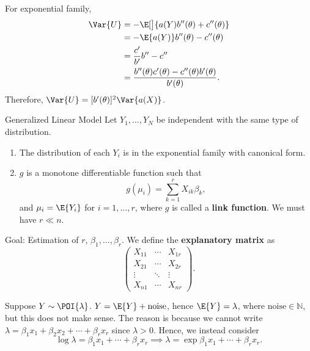 \begin{Remark}{}{}
    For exponential family,
    \begin{align*}
        \Var{U}
         & =-\E[\big]{a(Y)b''(\theta)+c''(\theta)}                          \\
         & =-\E{a(Y)}b''(\theta)-c''(\theta)                                \\
         & =\frac{c'}{b'}b''-c''                                            \\
         & =\frac{b''(\theta)c'(\theta)-c''(\theta)b'(\theta)}{b'(\theta)}.
    \end{align*}
    Therefore, $ \Var{U}=[b'(\theta)]^2\Var{a(X)} $.
\end{Remark}
\begin{Definition}{Generalized Linear Model}{}
    Let $ Y_1,\ldots,Y_N $ be independent with
    the same type of distribution.
    \begin{enumerate}[(1)]
        \item The distribution of each $ Y_i $ is in the exponential family
              with canonical form.
        \item $ g $ is a monotone differentiable function such that
              \[ g(\mu_i)=\sum_{k=1}^{r}X_{ik}\beta_k, \]
              and $ \mu_i=\E{Y_i} $ for $ i=1,\ldots,r $, where
              $ g $ is called a \textbf{link function}. We must have
              $ r\ll n $.
    \end{enumerate}
    Goal: Estimation of $ r $, $ \beta_1,\ldots,\beta_r $.
    We define the \textbf{explanatory matrix} as
    \[ \begin{pmatrix}
            X_{11} & \cdots & X_{1r} \\
            X_{21} & \cdots & X_{2r} \\
            \vdots & \ddots & \vdots \\
            X_{n1} & \cdots & X_{nr}
        \end{pmatrix}. \]
\end{Definition}
\begin{Example}{}{}
    Suppose $ Y \sim \POI{\lambda} $. $ Y=\E{Y}+\text{noise} $,
    hence $ \E{Y}=\lambda $, where $ \text{noise}\in\mathbb{N} $, but this
    does not make sense.
    The reason is because we cannot write $ \lambda=\beta_1 x_1+\beta_2 x_2+\cdots+\beta_r x_r $
    since $ \lambda>0 $. Hence, we instead consider
    \[ \log{\lambda}=\beta_1x_1+\cdots+\beta_r x_r\implies
        \lambda=\exp{\beta_1 x_1+\cdots+\beta_r x_r}. \]
\end{Example}